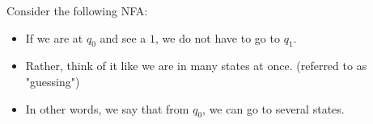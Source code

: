\documentclass[11pt,a4paper]{article}
\begin{document}
\begin{example}
    Consider the following NFA:
    
    \begin{itemize}
        \item If we are at $q_0$ and see a $1$, we do not have to go to $q_1$.
        \item Rather, think of it like we are in many states at once. (referred to as "guessing")
        \item In other words, we say that from $q_0$, we can go to several states.
    \end{itemize}
\end{example}
\end{document}

